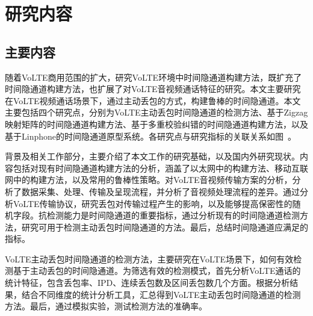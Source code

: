 \section{研究内容}
\label{sec:intro:work}

\subsection{主要内容}
\label{sec:intro:work:mainwork}

随着VoLTE商用范围的扩大，研究VoLTE环境中时间隐通道构建方法，既扩充了时间隐通道构建方法，也扩展了对VoLTE音视频通话特征的研究。本文主要研究在VoLTE视频通话场景下，通过主动丢包的方式，构建鲁棒的时间隐通道。本文主要包括四个研究点，分别为VoLTE主动丢包时间隐通道的检测方法、基于Zigzag映射矩阵的时间隐通道构建方法、基于多重校验纠错的时间隐通道构建方法，以及基于Linphone的时间隐通道原型系统。各研究点与研究指标的关联关系如图\ 。


背景及相关工作部分，主要介绍了本文工作的研究基础，以及国内外研究现状。内容包括对现有时间隐通道构建方法的分析，涵盖了以太网中的构建方法、移动互联网中的构建方法，以及常用的鲁棒性策略。对VoLTE音视频传输方案的分析，分析了数据采集、处理、传输及呈现流程，并分析了音视频处理流程的差异。通过分析VoLTE传输协议，研究丢包对传输过程产生的影响，以及能够提高保密性的随机字段。抗检测能力是时间隐通道的重要指标，通过分析现有的时间隐通道检测方法，研究可用于检测主动丢包时间隐通道的方法。最后，总结时间隐通道应满足的指标。

VoLTE主动丢包时间隐通道的检测方法，主要研究在VoLTE场景下，如何有效检测基于主动丢包的时间隐通道。为筛选有效的检测模式，首先分析VoLTE通话的统计特征，包含丢包率、IPD、连续丢包数及区间丢包数几个方面。根据分析结果，结合不同维度的统计分析工具，汇总得到VoLTE主动丢包时间隐通道的检测方法。最后，通过模拟实验，测试检测方法的准确率。

